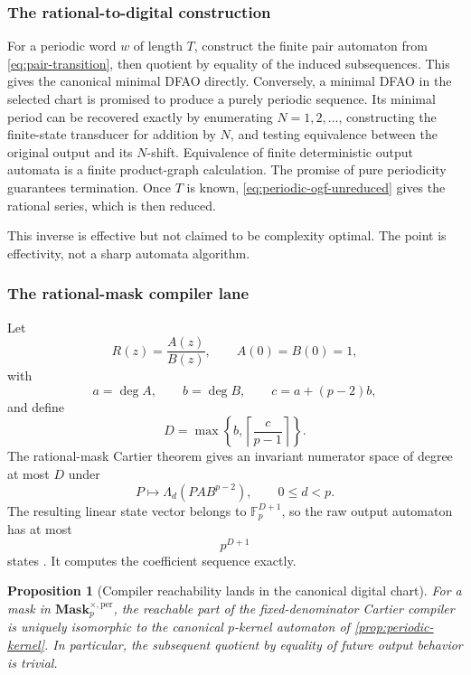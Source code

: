 \documentclass[11pt]{article}
\newtheorem{proposition}[theorem]{Proposition}
\theoremstyle{definition}
\theoremstyle{remark}
\newcommand{\Mask}{\mathbf{Mask}}
\begin{document}
\subsubsection{The rational-to-digital construction}

For a periodic word \(w\) of length \(T\), construct the finite pair automaton from \cref{eq:pair-transition}, then quotient by equality of the induced subsequences.  This gives the canonical minimal DFAO directly.  Conversely, a minimal DFAO in the selected chart is promised to produce a purely periodic sequence.  Its minimal period can be recovered exactly by enumerating \(N=1,2,\ldots\), constructing the finite-state transducer for addition by \(N\), and testing equivalence between the original output and its \(N\)-shift.  Equivalence of finite deterministic output automata is a finite product-graph calculation.  The promise of pure periodicity guarantees termination.  Once \(T\) is known, \cref{eq:periodic-ogf-unreduced} gives the rational series, which is then reduced.

This inverse is effective but not claimed to be complexity optimal.  The point is effectivity, not a sharp automata algorithm.

\subsubsection{The rational-mask compiler lane}

Let
\[
R(z)=\frac{A(z)}{B(z)},
\qquad
A(0)=B(0)=1,
\]
with
\[
a=\deg A,
\qquad
b=\deg B,
\qquad
c=a+(p-2)b,
\]
and define
\begin{equation}
\label{eq:cartier-degree-bound-block03}
D=\max\left\{b,\left\lceil\frac{c}{p-1}\right\rceil\right\}.
\end{equation}
The rational-mask Cartier theorem gives an invariant numerator space of degree at most \(D\) under
\[
P\longmapsto\Lambda_d(PAB^{p-2}),
\qquad 0\leq d<p.
\]
The resulting linear state vector belongs to \(\mathbb F_p^{D+1}\), so the raw output automaton has at most
\begin{equation}
\label{eq:compiler-state-bound-block03}
p^{D+1}
\end{equation}
states \cite{FMH}.  It computes the coefficient sequence exactly.

\begin{proposition}[Compiler reachability lands in the canonical digital chart]
\label{prop:compiler-minimal-core}
For a mask in \(\Mask_p^{\times,\mathrm{per}}\), the reachable part of the fixed-denominator Cartier compiler is uniquely isomorphic to the canonical \(p\)-kernel automaton of \cref{prop:periodic-kernel}.  In particular, the subsequent quotient by equality of future output behavior is trivial.
\end{proposition}
\end{document}
